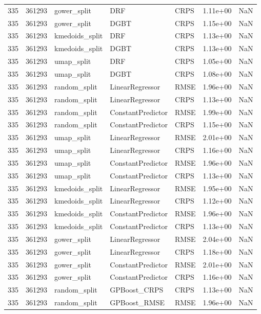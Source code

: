 \begin{tabular}{rrlllrr}
335 & 361293 & gower\_split & DRF & CRPS & 1.11e+00 & NaN \\
335 & 361293 & gower\_split & DGBT & CRPS & 1.15e+00 & NaN \\
335 & 361293 & kmedoids\_split & DRF & CRPS & 1.13e+00 & NaN \\
335 & 361293 & kmedoids\_split & DGBT & CRPS & 1.13e+00 & NaN \\
335 & 361293 & umap\_split & DRF & CRPS & 1.05e+00 & NaN \\
335 & 361293 & umap\_split & DGBT & CRPS & 1.08e+00 & NaN \\
335 & 361293 & random\_split & LinearRegressor & RMSE & 1.96e+00 & NaN \\
335 & 361293 & random\_split & LinearRegressor & CRPS & 1.13e+00 & NaN \\
335 & 361293 & random\_split & ConstantPredictor & RMSE & 1.99e+00 & NaN \\
335 & 361293 & random\_split & ConstantPredictor & CRPS & 1.15e+00 & NaN \\
335 & 361293 & umap\_split & LinearRegressor & RMSE & 2.01e+00 & NaN \\
335 & 361293 & umap\_split & LinearRegressor & CRPS & 1.16e+00 & NaN \\
335 & 361293 & umap\_split & ConstantPredictor & RMSE & 1.96e+00 & NaN \\
335 & 361293 & umap\_split & ConstantPredictor & CRPS & 1.13e+00 & NaN \\
335 & 361293 & kmedoids\_split & LinearRegressor & RMSE & 1.95e+00 & NaN \\
335 & 361293 & kmedoids\_split & LinearRegressor & CRPS & 1.12e+00 & NaN \\
335 & 361293 & kmedoids\_split & ConstantPredictor & RMSE & 1.96e+00 & NaN \\
335 & 361293 & kmedoids\_split & ConstantPredictor & CRPS & 1.13e+00 & NaN \\
335 & 361293 & gower\_split & LinearRegressor & RMSE & 2.04e+00 & NaN \\
335 & 361293 & gower\_split & LinearRegressor & CRPS & 1.18e+00 & NaN \\
335 & 361293 & gower\_split & ConstantPredictor & RMSE & 2.01e+00 & NaN \\
335 & 361293 & gower\_split & ConstantPredictor & CRPS & 1.16e+00 & NaN \\
335 & 361293 & random\_split & GPBoost\_CRPS & CRPS & 1.13e+00 & NaN \\
335 & 361293 & random\_split & GPBoost\_RMSE & RMSE & 1.96e+00 & NaN \\

\end{tabular}
